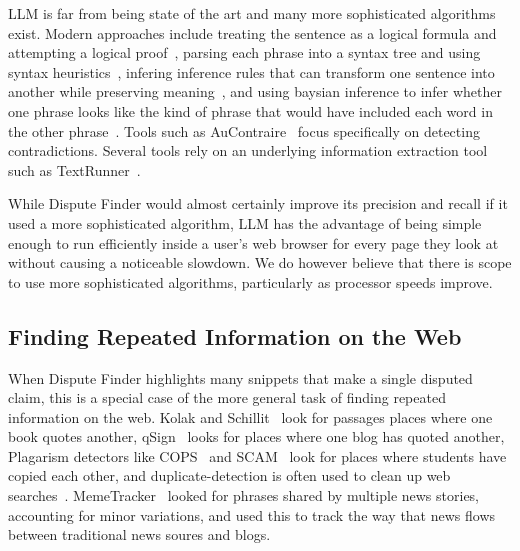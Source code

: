 \documentclass{www2010-submission}
\newcommand{\todo}[1]{}
\begin{document}
\todo{Implement word weighting and word similarity?}

%

LLM is far from being state of the art and many more sophisticated algorithms exist. Modern approaches include treating the sentence as a logical formula and attempting a logical proof~\cite{Bayer2001,Bos2005}, parsing each phrase into a syntax tree and using syntax heuristics~\cite{Snow2006}, infering inference rules that can transform one sentence into another while preserving meaning~\cite{Lin2002,Dinu2009,Bhagat2009}, and using baysian inference to infer whether one phrase looks like the kind of phrase that would have included each word in the other phrase~\cite{Glickman2005}. Tools such as AuContraire~\cite{Ritter2008} focus specifically on detecting contradictions. Several tools rely on an underlying information extraction tool such as TextRunner~\cite{Etzioni2008}.

While Dispute Finder would almost certainly improve its precision and recall if it used a more sophisticated algorithm, LLM has the advantage of being simple enough to run efficiently inside a user's web browser for every page they look at without causing a noticeable slowdown. We do however believe that there is scope to use more sophisticated algorithms, particularly as processor speeds improve.

\todo{Talk about Glickman et all 2005 and MT system of Bayer et al 2005}
\todo{Cite Web Based probabalistic textual entailment}
\todo{Cite MITRE's submission to the EU PASCAL RTE Challenge}

\todo{Talk a lot about how people do textual entailment now}
\todo{Do human-guided approach that works well? Talk more about human guided task.}


\subsection{Finding Repeated Information on the Web}

\todo{is this important}

When Dispute Finder highlights many snippets that make a single disputed claim, this is a special case of the more general task of finding repeated information on the web. Kolak and Schillit~\cite{Kolak2008} look for passages places where one book quotes another, qSign~\cite{Kim2009} looks for places where one blog has quoted another, Plagarism detectors like COPS~\cite{COPS} and SCAM~\cite{SCAM} look for places where students have copied each other, and duplicate-detection is often used to clean up web searches~\cite{web-copy-detect}. MemeTracker~\cite{Backstrom2009} looked for phrases shared by multiple news stories, accounting for minor variations, and used this to track the way that news flows between traditional news soures and blogs.
\end{document}
